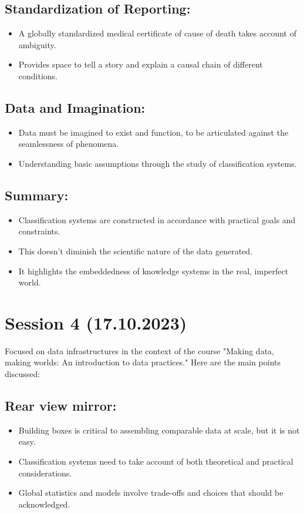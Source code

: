 \documentclass{article}
\begin{document}
\subsection*{Standardization of Reporting:}
\begin{itemize}
  \item A globally standardized medical certificate of cause of death takes account of ambiguity.
  \item Provides space to tell a story and explain a causal chain of different conditions.
\end{itemize}

\subsection*{Data and Imagination:}
\begin{itemize}
  \item Data must be imagined to exist and function, to be articulated against the seamlessness of phenomena.
  \item Understanding basic assumptions through the study of classification systems.
\end{itemize}

\subsection*{Summary:}
\begin{itemize}
  \item Classification systems are constructed in accordance with practical goals and constraints.
  \item This doesn't diminish the scientific nature of the data generated.
  \item It highlights the embeddedness of knowledge systems in the real, imperfect world.
\end{itemize}

\section*{Session 4 (17.10.2023)}

Focused on data infrastructures in the context of the course "Making data, making worlds: An introduction to data practices." Here are the main points discussed:

\subsection*{Rear view mirror:}
\begin{itemize}
    \item Building boxes is critical to assembling comparable data at scale, but it is not easy.
    \item Classification systems need to take account of both theoretical and practical considerations.
    \item Global statistics and models involve trade-offs and choices that should be acknowledged.
\end{itemize}
\end{document}
